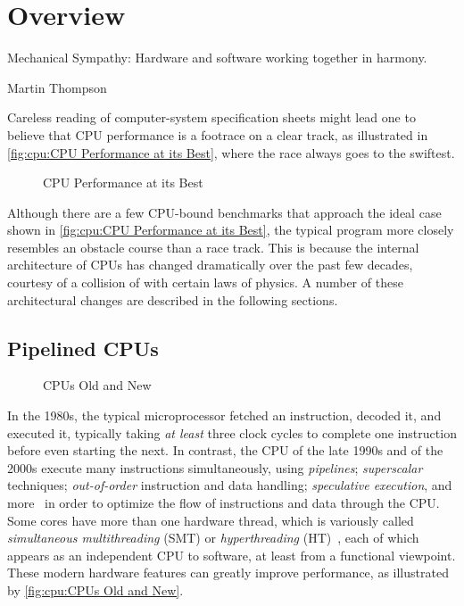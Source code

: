 
\section{Overview}
\label{sec:cpu:Overview}
%
\epigraph{Mechanical Sympathy:
	  Hardware and software working together in harmony.}
	 {Martin Thompson}

Careless reading of computer-system specification sheets might lead one
to believe that CPU performance is a footrace on a clear track, as
illustrated in \cref{fig:cpu:CPU Performance at its Best},
where the race always goes to the swiftest.

\begin{figure}
\centering
{}
\caption{CPU Performance at its Best}
\end{figure}

Although there are a few CPU-bound benchmarks that approach the ideal case
shown in \cref{fig:cpu:CPU Performance at its Best},
the typical program more closely resembles an obstacle course than
a race track.
This is because the internal architecture of CPUs has changed dramatically
over the past few decades, courtesy of a collision of 
with certain laws of physics.
A number of these architectural changes are described in the following
sections.

\subsection{Pipelined CPUs}
\label{sec:cpu:Pipelined CPUs}

\begin{figure}
\centering
{}
\caption{CPUs Old and New}
\end{figure}

In the 1980s, the typical microprocessor fetched an instruction, decoded
it, and executed it, typically taking \emph{at least} three clock cycles
to complete one instruction before even starting the next.
In contrast, the CPU of the late 1990s and of the 2000s execute many
instructions simultaneously, using \emph{pipelines}; \emph{superscalar}
techniques; \emph{out-of-order} instruction and data handling;
\emph{speculative execution}, and
more~\cite{Hennessy2017}
in order to optimize the flow of instructions and data through the CPU\@.
Some cores have more than one hardware thread, which is variously called
\emph{simultaneous multithreading} (SMT) or \emph{hyperthreading}
(HT)~\cite{JFennel1973SMT},
each of which appears as
an independent CPU to software, at least from a functional viewpoint.
These modern hardware features can greatly improve performance, as
illustrated by \cref{fig:cpu:CPUs Old and New}.

